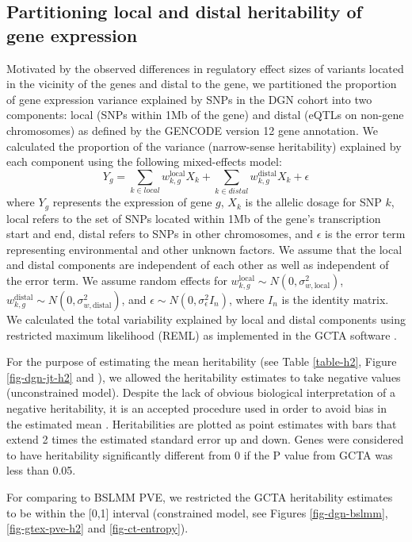 \documentclass[10pt,letterpaper]{article}
\begin{document}
\subsection*{Partitioning local and distal heritability of gene
expression}\label{partitioning-local-and-distal-heritability-of-gene-expression}

Motivated by the observed differences in regulatory effect sizes of variants located in the vicinity of the genes and distal to the gene,
we partitioned the proportion of gene expression variance explained by
SNPs in the DGN cohort into two components: local (SNPs within 1Mb of
the gene) and distal (eQTLs on non-gene chromosomes) as defined by the
GENCODE \cite{Harrow_2012} version 12 gene annotation. We calculated the
proportion of the variance (narrow-sense heritability) explained by each
component using the following mixed-effects model:
%
\[ Y_g = \sum_{k  \in local}w^\text{local}_{k,g} X_k + \sum_{k  \in distal}w^\text{distal}_{k,g} X_k + \epsilon \]
%
where $Y_g$ represents the expression of gene $g$, $X_k$ is the allelic dosage for SNP $k$, local refers to the set of SNPs located within 1Mb of the gene's transcription start and end, distal refers to SNPs in other chromosomes, and $\epsilon$ is the error term representing environmental and other unknown factors. We assume that the local and distal components are independent of each other as well as independent of the error term.
We assume random effects for \(w^\text{local}_{k,g} \sim N(0, \sigma^2_{w,\text{local}})\), \(w^\text{distal}_{k,g} \sim N(0, \sigma^2_{w,\text{distal}})\), and
\(\epsilon \sim N(0, \sigma^2_{\epsilon} I_n)\), where \(I_n\) is the
identity matrix. We calculated the total variability explained by local
and distal components using restricted
maximum likelihood (REML) as implemented in the GCTA software \cite{Yang_2011}. 

For the purpose of estimating the mean heritability (see Table \ref{table-h2}, Figure \ref{fig-dgn-jt-h2} and ), we allowed the heritability estimates to 
take negative values (unconstrained model). Despite the lack of obvious biological interpretation of a negative heritability, 
it is an accepted procedure used in order to avoid bias in the estimated mean \cite{Price_2011,Wright_2014}. Heritabilities are plotted as point estimates with bars that extend 2 times the estimated standard error up and down. Genes were considered to have heritability significantly different from 0 if the P value from GCTA was less than 0.05.

For comparing to BSLMM PVE, we restricted the GCTA heritability estimates to be within the [0,1] interval (constrained model, see Figures \ref{fig-dgn-bslmm}, \ref{fig-gtex-pve-h2} and \ref{fig-ct-entropy}). 
\end{document}
